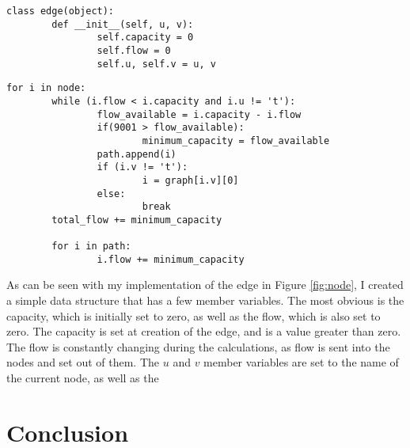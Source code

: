 \documentclass[conference]{IEEEtran}
\begin{document}
\begin{figure*}[t, label=node]
\begin{lstlisting}
class edge(object):
        def __init__(self, u, v):
                self.capacity = 0
                self.flow = 0
                self.u, self.v = u, v
\end{lstlisting}
\caption{Node Class in Python}\label{fig:node}
\end{figure*}

\begin{figure*}[t]
\begin{lstlisting}
for i in node:
        while (i.flow < i.capacity and i.u != 't'):
                flow_available = i.capacity - i.flow
                if(9001 > flow_available):
                        minimum_capacity = flow_available
                path.append(i)
                if (i.v != 't'):
                        i = graph[i.v][0]
                else:
                        break
        total_flow += minimum_capacity

        for i in path:
                i.flow += minimum_capacity
\end{lstlisting}
\caption{Ford Fulkerson Algorithm in Python}\label{fig:algo}
\end{figure*}

As can be seen with my implementation of the edge in Figure \ref{fig:node}, I created a simple data structure that has a few member variables. The most obvious is the capacity, which is initially set to zero, as well as the flow, which is also set to zero. The capacity is set at creation of the edge, and is a value greater than zero. The flow is constantly changing during the calculations, as flow is sent into the nodes and set out of them. The $u$ and $v$ member variables are set to the name of the current node, as well as the 
\section{Conclusion}


%
%
\end{document}
